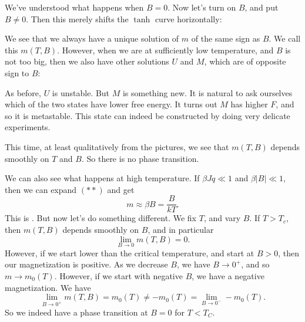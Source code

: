\documentclass[a4paper]{article}
\begin{document}
We've understood what happens when $B = 0$. Now let's turn on $B$, and put $B \not= 0$. Then this merely shifts the $\tanh$ curve horizontally:
\begin{center}
\end{center}
We see that we always have a unique solution of $m$ of the same sign as $B$. We call this $m(T, B)$. However, when we are at sufficiently low temperature, and $B$ is not too big, then we also have other solutions $U$ and $M$, which are of opposite sign to $B$:
\begin{center}
\end{center}
As before, $U$ is unstable. But $M$ is something new. It is natural to ask ourselves which of the two states have lower free energy. It turns out $M$ has higher $F$, and so it is metastable. This state can indeed be constructed by doing very delicate experiments.

This time, at least qualitatively from the pictures, we see that $m(T, B)$ depends smoothly on $T$ and $B$. So there is no phase transition.

We can also see what happens at high temperature. If $\beta J q \ll 1$ and $\beta |B| \ll 1$, then we can expand $(**)$ and get
\[
  m \approx \beta B = \frac{B}{kT}.
\]
This is . But now let's do something different. We fix $T$, and vary $B$. If $T > T_c$, then $m(T, B)$ depends smoothly on $B$, and in particular
\[
  \lim_{B \to 0} m(T, B) = 0.
\]
However, if we start lower than the critical temperature, and start at $B > 0$, then our magnetization is positive. As we decrease $B$, we have $B \to 0^+$, and so $m \to m_0(T)$. However, if we start with negative $B$, we have a negative magnetization. We have
\[
  \lim_{B \to 0^+} m(T, B) = m_0(T) \not= - m_0(T) = \lim_{B \to 0^-} -m_0(T).
\]
So we indeed have a phase transition at $B = 0$ for $T < T_C$.
\end{document}
